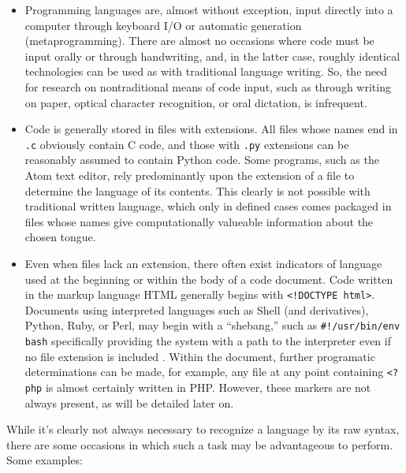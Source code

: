 \documentclass{article}
\begin{document}
\begin{itemize}
    \item{Programming languages are, almost without exception, input directly into a computer through keyboard I/O or automatic generation (metaprogramming). There are almost no occasions where code must be input orally or through handwriting, and, in the latter case, roughly identical technologies can be used as with traditional language writing. So, the need for research on nontraditional means of code input, such as through writing on paper, optical character recognition, or oral dictation, is infrequent.}
    \item{Code is generally stored in files with extensions. All files whose names end in \texttt{.c} obviously contain C code, and those with \texttt{.py} extensions can be reasonably assumed to contain Python code. Some programs, such as the Atom text editor, rely predominantly upon the extension of a file to determine the language of its contents. This clearly is not possible with traditional written language, which only in defined cases comes packaged in files whose names give computationally valueable information about the chosen tongue.}
    \item{Even when files lack an extension, there often exist indicators of language used at the beginning or within the body of a code document. Code written in the markup language \cite{htmlnotproglang} HTML generally begins with \texttt{<!DOCTYPE html>}. Documents using interpreted languages such as Shell (and derivatives), Python, Ruby, or Perl, may begin with a ``shebang,'' such as \texttt{#!/usr/bin/env bash} specifically providing the system with a path to the interpreter even if no file extension is included \cite{shebang}. Within the document, further programatic determinations can be made, for example, any file at any point containing \texttt{<?php} is almost certainly written in PHP. However, these markers are not always present, as will be detailed later on.}
\end{itemize}
While it's clearly not always necessary to recognize a language by its raw syntax, there are some occasions in which such a task may be advantageous to perform. Some examples:
\end{document}
